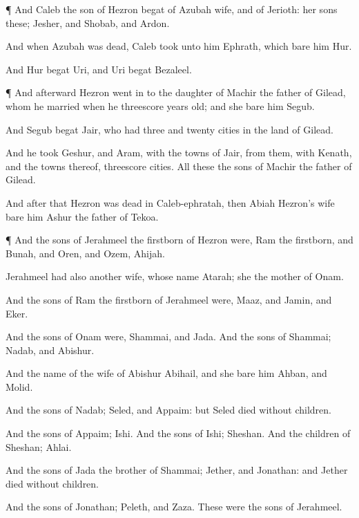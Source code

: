 {\par }{\PP {}¶ And
Caleb the
son of
Hezron
begat
{}
of
Azubah
{}
wife, and of
Jerioth: her
sons
{} these;
Jesher, and
Shobab, and
Ardon.

And when
Azubah was
dead,
Caleb
took unto him
Ephrath, which
bare him
Hur.

And
Hur
begat
Uri, and
Uri
begat
Bezaleel.


\par }{\PP {}¶ And
afterward
Hezron went
in to the
daughter of
Machir the
father of
Gilead, whom he
married when he
{}
threescore
years
old; and she
bare him
Segub.

And
Segub
begat
Jair, who had
three and
twenty
cities in the
land of
Gilead.

And he
took
Geshur, and
Aram, with the
towns of
Jair, from them, with
Kenath, and the
towns thereof,
{}
threescore
cities. All these
{} the
sons of
Machir the
father of
Gilead.

And
after that
Hezron was
dead in
Caleb-ephratah, then
Abiah
Hezron’s
wife
bare him
Ashur the
father of
Tekoa.


\par }{\PP {}¶ And the
sons of
Jerahmeel the
firstborn of
Hezron were,
Ram the
firstborn, and
Bunah, and
Oren, and
Ozem,
{}
Ahijah.

Jerahmeel had also
another
wife, whose
name
{}
Atarah; she
{} the
mother of
Onam.

And the
sons of
Ram the
firstborn of
Jerahmeel were,
Maaz, and
Jamin, and
Eker.

And the
sons of
Onam were,
Shammai, and
Jada. And the
sons of
Shammai;
Nadab, and
Abishur.

And the
name of the
wife of
Abishur
{}
Abihail, and she
bare him
Ahban, and
Molid.

And the
sons of
Nadab;
Seled, and
Appaim: but
Seled
died without
children.

And the
sons of
Appaim;
Ishi. And the
sons of
Ishi;
Sheshan. And the
children of
Sheshan;
Ahlai.

And the
sons of
Jada the
brother of
Shammai;
Jether, and
Jonathan: and
Jether
died without
children.

And the
sons of
Jonathan;
Peleth, and
Zaza. These were the
sons of
Jerahmeel.


}
